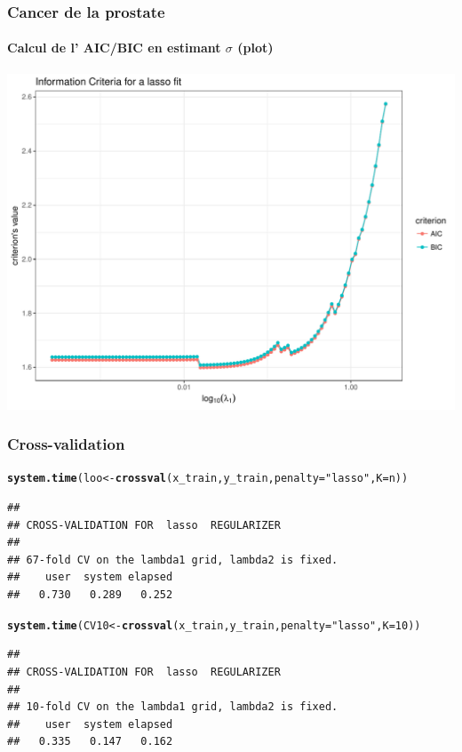 \documentclass{beamer}\usepackage[]{graphicx}\usepackage[]{color}
\makeatletter
\newcommand{\hlnum}[1]{\textcolor[rgb]{0.686,0.059,0.569}{#1}}%
\newcommand{\hlstr}[1]{\textcolor[rgb]{0.192,0.494,0.8}{#1}}%
\newcommand{\hlstd}[1]{\textcolor[rgb]{0.345,0.345,0.345}{#1}}%
\newcommand{\hlkwb}[1]{\textcolor[rgb]{0.69,0.353,0.396}{#1}}%
\newcommand{\hlkwc}[1]{\textcolor[rgb]{0.333,0.667,0.333}{#1}}%
\newcommand{\hlkwd}[1]{\textcolor[rgb]{0.737,0.353,0.396}{\textbf{#1}}}%
\newenvironment{kframe}{%
 \def\at@end@of@kframe{}%
 \ifinner\ifhmode%
  \def\at@end@of@kframe{\end{minipage}}%
  \begin{minipage}{\columnwidth}%
 \fi\fi%
 \def\FrameCommand##1{\hskip\@totalleftmargin \hskip-\fboxsep
 \colorbox{shadecolor}{##1}\hskip-\fboxsep
     \hskip-\linewidth \hskip-\@totalleftmargin \hskip\columnwidth}%
 \MakeFramed {\advance\hsize-\width
   \@totalleftmargin\z@ \linewidth\hsize
   \@setminipage}}%
 {\par\unskip\endMakeFramed%
 \at@end@of@kframe}
\newenvironment{knitrout}{}{} %
\makeatother
\begin{document}
\begin{frame}[containsverbatim]
 \frametitle{Cancer de la prostate}
 \framesubtitle{Calcul de l' AIC/BIC en estimant $\sigma$ (plot)}

\begin{knitrout}\scriptsize
{}\color{fgcolor}
\includegraphics[width=.8\textwidth]{figures/crit_lassounnamed-chunk-33-1} 

\end{knitrout}
\end{frame}

\begin{frame}[containsverbatim]
  \frametitle{Cross-validation}

\begin{knitrout}\scriptsize
{}\color{fgcolor}\begin{kframe}
\begin{alltt}
\hlkwd{system.time}\hlstd{(loo} \hlkwb{<-} \hlkwd{crossval}\hlstd{(x_train, y_train,} \hlkwc{penalty} \hlstd{=} \hlstr{"lasso"}\hlstd{,} \hlkwc{K} \hlstd{= n))}
\end{alltt}
\begin{verbatim}
## 
## CROSS-VALIDATION FOR  lasso  REGULARIZER 
## 
## 67-fold CV on the lambda1 grid, lambda2 is fixed.
##    user  system elapsed 
##   0.730   0.289   0.252
\end{verbatim}
\end{kframe}
\end{knitrout}

\begin{knitrout}\scriptsize
{}\color{fgcolor}\begin{kframe}
\begin{alltt}
\hlkwd{system.time}\hlstd{(CV10} \hlkwb{<-} \hlkwd{crossval}\hlstd{(x_train, y_train,} \hlkwc{penalty} \hlstd{=} \hlstr{"lasso"}\hlstd{,} \hlkwc{K} \hlstd{=} \hlnum{10}\hlstd{))}
\end{alltt}
\begin{verbatim}
## 
## CROSS-VALIDATION FOR  lasso  REGULARIZER 
## 
## 10-fold CV on the lambda1 grid, lambda2 is fixed.
##    user  system elapsed 
##   0.335   0.147   0.162
\end{verbatim}
\end{kframe}
\end{knitrout}

\end{frame}
\end{document}
